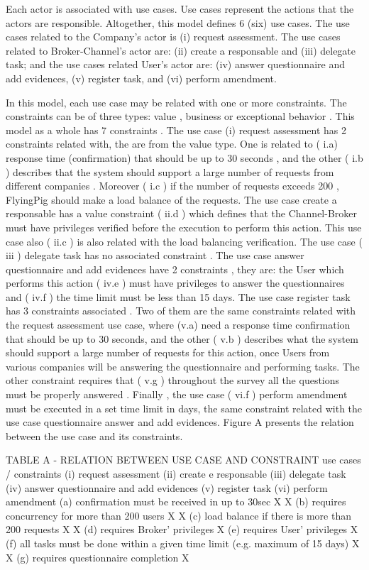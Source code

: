 Each actor is associated with use cases. Use cases represent the actions that the actors are responsible. Altogether, this model defines 6 (six) use cases. The use cases related to the Company's actor is (i) request assessment. The use cases related to Broker-Channel's actor are: (ii) create a responsable and (iii) delegate task; and the use cases related User's actor are: (iv) answer questionnaire and add evidences, (v) register task, and (vi) perform amendment.

In this model, each use case may be related with one or more constraints. The constraints can be of three types: value , business or exceptional behavior . This model as a whole has 7 constraints . The use case (i) request assessment has 2 constraints related with, the are from the value type. One is related to ( i.a) response time (confirmation) that should be up to 30 seconds , and the other ( i.b ) describes that the system should support a large number of requests from different companies . Moreover ( i.c ) if the number of requests exceeds 200 , FlyingPig should make a load balance of the requests. The use case create a responsable has a value constraint ( ii.d ) which defines that the Channel-Broker must have privileges verified before the execution to perform this action. This use case also ( ii.c ) is also related with the load balancing verification. The use case ( iii ) delegate task has no associated constraint . The use case answer questionnaire and add evidences have 2 constraints , they are: the User which performs this action ( iv.e ) must have privileges to answer the questionnaires and ( iv.f ) the time limit must be less than 15 days. The use case register task has 3 constraints associated . Two of them are the same constraints related with the request assessment use case, where (v.a) need a response time confirmation that should be up to 30 seconds, and the other ( v.b ) describes what the system should support a large number of requests for this action, once Users from various companies will be answering the questionnaire and performing tasks. The other constraint requires that ( v.g ) throughout the survey all the questions must be properly answered . Finally , the use case ( vi.f ) perform amendment must be executed in a set time limit in days, the same constraint related with the use case questionnaire answer and add evidences. Figure A presents the relation between the use case and its constraints.






TABLE A - RELATION BETWEEN USE CASE AND CONSTRAINT
use cases / constraints	(i) request assessment	(ii) create e responsable 	(iii) delegate task	(iv) answer questionnaire and add evidences	(v) register task	(vi) perform amendment
(a) confirmation must be received in up to 30sec	X				X	
(b) requires concurrency for more than 200 users	X				X	
(c) load balance if there is more than 200 requests	X	X				
(d) requires Broker’ privileges		X				
(e) requires User' privileges				X		
(f) all tasks must be done within a given time limit (e.g. maximum of 15 days)				X		X
(g) requires questionnaire completion					X	


